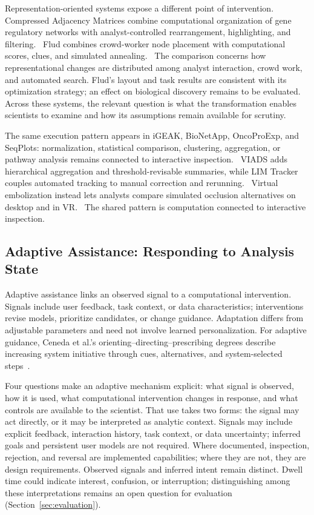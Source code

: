 

Representation-oriented systems expose a different point of intervention. Compressed Adjacency Matrices combine computational organization of gene regulatory networks with analyst-controlled rearrangement, highlighting, and filtering.~\cite{AnchorCompressedMatrices} Flud combines crowd-worker node placement with computational scores, clues, and simulated annealing.~\cite{bharadwaj2022flud} The comparison concerns how representational changes are distributed among analyst interaction, crowd work, and automated search. Flud’s layout and task results are consistent with its optimization strategy; an effect on biological discovery remains to be evaluated. Across these systems, the relevant question is what the transformation enables scientists to examine and how its assumptions remain available for scrutiny.

The same execution pattern appears in iGEAK, BioNetApp, OncoProExp, and SeqPlots: normalization, statistical comparison, clustering, aggregation, or pathway analysis remains connected to interactive inspection.~\cite{ExpandedE38,ExpandedE39,ExpandedE47,ExpandedE44} VIADS adds hierarchical aggregation and threshold-revisable summaries, while LIM Tracker couples automated tracking to manual correction and rerunning.~\cite{ExpandedE40,ExpandedE32} Virtual embolization instead lets analysts compare simulated occlusion alternatives on desktop and in VR.~\cite{ExpandedE30} The shared pattern is computation connected to interactive inspection.

\subsection{Adaptive Assistance: Responding to Analysis State}
\label{sec:assistance-adaptive}

Adaptive assistance links an observed signal to a computational intervention. Signals include user feedback, task context, or data characteristics; interventions revise models, prioritize candidates, or change guidance. Adaptation differs from adjustable parameters and need not involve learned personalization. For adaptive guidance, Ceneda et al.'s orienting--directing--prescribing degrees describe increasing system initiative through cues, alternatives, and system-selected steps~\cite{Ceneda2017Guidance,Ceneda2019GuidanceReview}.

Four questions make an adaptive mechanism explicit: what signal is observed, how it is used, what computational intervention changes in response, and what controls are available to the scientist. That use takes two forms: the signal may act directly, or it may be interpreted as analytic context. Signals may include explicit feedback, interaction history, task context, or data uncertainty; inferred goals and persistent user models are not required. Where documented, inspection, rejection, and reversal are implemented capabilities; where they are not, they are design requirements. Observed signals and inferred intent remain distinct. Dwell time could indicate interest, confusion, or interruption; distinguishing among these interpretations remains an open question for evaluation (Section~\ref{sec:evaluation}).

